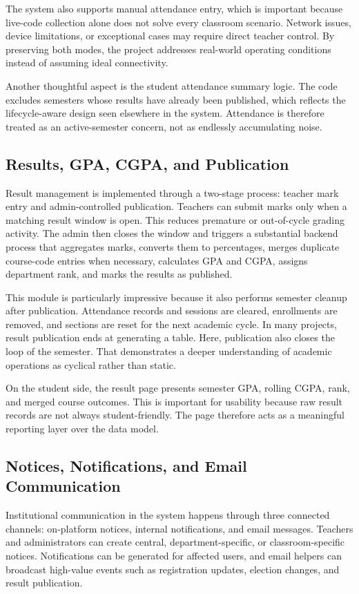 \documentclass[12pt,a4paper]{report}
\begin{document}
The system also supports manual attendance entry, which is important because live-code collection alone does not solve every classroom scenario. Network issues, device limitations, or exceptional cases may require direct teacher control. By preserving both modes, the project addresses real-world operating conditions instead of assuming ideal connectivity.

Another thoughtful aspect is the student attendance summary logic. The code excludes semesters whose results have already been published, which reflects the lifecycle-aware design seen elsewhere in the system. Attendance is therefore treated as an active-semester concern, not as endlessly accumulating noise.

\subsection{Results, GPA, CGPA, and Publication}
Result management is implemented through a two-stage process: teacher mark entry and admin-controlled publication. Teachers can submit marks only when a matching result window is open. This reduces premature or out-of-cycle grading activity. The admin then closes the window and triggers a substantial backend process that aggregates marks, converts them to percentages, merges duplicate course-code entries when necessary, calculates GPA and CGPA, assigns department rank, and marks the results as published.

This module is particularly impressive because it also performs semester cleanup after publication. Attendance records and sessions are cleared, enrollments are removed, and sections are reset for the next academic cycle. In many projects, result publication ends at generating a table. Here, publication also closes the loop of the semester. That demonstrates a deeper understanding of academic operations as cyclical rather than static.

On the student side, the result page presents semester GPA, rolling CGPA, rank, and merged course outcomes. This is important for usability because raw result records are not always student-friendly. The page therefore acts as a meaningful reporting layer over the data model.

\subsection{Notices, Notifications, and Email Communication}
Institutional communication in the system happens through three connected channels: on-platform notices, internal notifications, and email messages. Teachers and administrators can create central, department-specific, or classroom-specific notices. Notifications can be generated for affected users, and email helpers can broadcast high-value events such as registration updates, election changes, and result publication.
\end{document}
